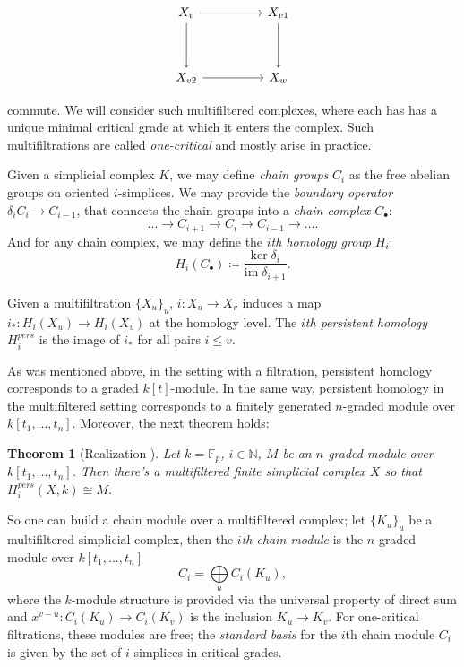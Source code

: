 \documentclass[a4paper,8pt,epsfig]{article}
\newtheorem{theorem}{Theorem}
\begin{document}
	 \[\begin{tikzcd}
	 {X_v} && {X_{v1}} \\
	 \\
	 {X_{v2}} && {X_w}
	 \arrow[from=1-1, to=1-3]
	 \arrow[from=1-1, to=3-1]
	 \arrow[from=3-1, to=3-3]
	 \arrow[from=1-3, to=3-3]
	 \end{tikzcd}\]
	 
	 commute. We will consider such multifiltered complexes, where each has has a unique minimal critical grade at which it enters the complex. Such multifiltrations are called {\it one-critical} and mostly arise in practice.
	 
	 Given a simplicial complex $K$, we may define {\it chain groups} $C_i$ as the free abelian groups on oriented $i$-simplices. We may provide the {\it boundary operator} $ \delta_i C_i \to C_{i-1}$, that connects the chain groups into a {\it chain complex} $C_\bullet$:
	 \[
	 	... \to C_{i+1} \to C_i \to C_{i-1} \to ... .
	 \]
	 And for any chain complex, we may define the {\it $i$th homology group} $H_i$:
	 \[
	 	H_i(C_\bullet) \coloneqq \frac{\mathrm{ker }\; \delta_i}{\mathrm{im }\; \delta_{i+1}}.
	 \]
	 
	 Given a multifiltration $\{ X_u \}_u$, $i: X_u \to X_v$ induces a map $i_*: H_i(X_u) \to H_i(X_v)$ at the homology level. The {\it $i$th persistent homology} $H_i^{pers}$  is the image of $i_*$ for all pairs $i \leq v$.
	 
	 As was mentioned above, in the setting with a filtration, persistent homology corresponds to a graded $k[t]$-module. In the same way, persistent homology in the multifiltered setting corresponds to a finitely generated $n$-graded module over $k[t_1, ..., t_n]$. Moreover, the next theorem holds:
	 
	 \begin{theorem}[Realization \cite{theormulpers}]
	 	Let $k = \mathbb{F}_p$, $i \in \mathbb{N}$, $M$ be an $n$-graded module over $k[t_1, ..., t_n]$. Then there's a multifiltered finite simplicial complex $X$ so that $H_i^{pers}(X, k) \cong M$.
	 \end{theorem}
 
 	 So one can build a chain module over a multifiltered complex; let $\{K_u\}_u$ be a multifiltered simplicial complex, then the {\it $i$th chain module} is the $n$-graded module over $k[t_1, ..., t_n]$
 	 \[
 	 	C_i = \bigoplus\limits_u C_i(K_u),
 	 \]
 	 where the $k$-module structure is provided via the universal property of direct sum and $x^{v-u}: C_i(K_u) \to C_i(K_v)$ is the inclusion $K_u \to K_v$. For one-critical filtrations, these modules are free; the {\it standard basis} for the $i$th chain module $C_i$ is given by the set of $i$-simplices in critical grades.
 	 
\end{document}
